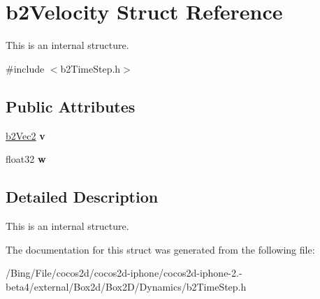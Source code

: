 \hypertarget{structb2_velocity}{\section{b2\-Velocity Struct Reference}
\label{structb2_velocity}
}


This is an internal structure.  




{\ttfamily \#include $<$b2\-Time\-Step.\-h$>$}

\subsection*{Public Attributes}
\begin{DoxyCompactItemize}
\item 
\hypertarget{structb2_velocity_a73b92ceff532491e71b9dbc53eecaa70}{\hyperlink{structb2_vec2}{b2\-Vec2} {\bfseries v}}\label{structb2_velocity_a73b92ceff532491e71b9dbc53eecaa70}

\item 
\hypertarget{structb2_velocity_a6ce6f6c83ceb95100532d3f2b0485b83}{float32 {\bfseries w}}\label{structb2_velocity_a6ce6f6c83ceb95100532d3f2b0485b83}

\end{DoxyCompactItemize}


\subsection{Detailed Description}
This is an internal structure. 

The documentation for this struct was generated from the following file\-:\begin{DoxyCompactItemize}
\item 
/\-Bing/\-File/cocos2d/cocos2d-\/iphone/cocos2d-\/iphone-\/2.-\/beta4/external/\-Box2d/\-Box2\-D/\-Dynamics/b2\-Time\-Step.\-h\end{DoxyCompactItemize}
